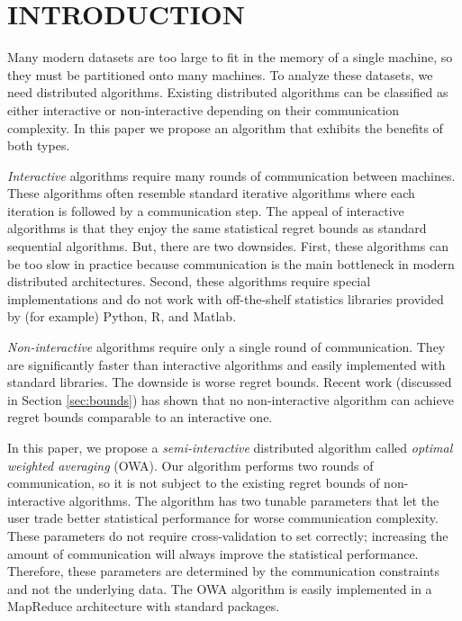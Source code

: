 \documentclass[twoside]{article}
\begin{document}



\section{INTRODUCTION}

Many modern datasets are too large to fit in the memory of a single machine,
so they must be partitioned onto many machines.
To analyze these datasets, we need distributed algorithms.
Existing distributed algorithms can be classified as either interactive or non-interactive depending on their communication complexity.
In this paper we propose an algorithm that exhibits the benefits of both types.

\emph{Interactive} algorithms require many rounds of communication between machines.
These algorithms often resemble standard iterative algorithms where each iteration is followed by a communication step.
The appeal of interactive algorithms is that they enjoy the same statistical regret bounds as standard sequential algorithms.
But, there are two downsides.
First, these algorithms can be too slow in practice because communication is the main bottleneck in modern distributed architectures.
Second, these algorithms require special implementations and do not work with off-the-shelf statistics libraries provided by (for example) Python, R, and Matlab.

\emph{Non-interactive} algorithms require only a single round of communication.
They are significantly faster than interactive algorithms and  easily implemented with standard libraries.
The downside is worse regret bounds.
Recent work (discussed in Section \ref{sec:bounds}) has shown that no non-interactive algorithm can achieve regret bounds comparable to an interactive one.

In this paper, we propose a \emph{semi-interactive} distributed algorithm called \emph{optimal weighted averaging} (OWA).
Our algorithm performs two rounds of communication,
so it is not subject to the existing regret bounds of non-interactive algorithms.
The algorithm has two tunable parameters that let the user trade better statistical performance for worse communication complexity.
These parameters do not require cross-validation to set correctly;
increasing the amount of communication will always improve the statistical performance.
Therefore, these parameters are determined by the communication constraints and not the underlying data.
The OWA algorithm is easily implemented in a MapReduce architecture with standard packages.
\end{document}
